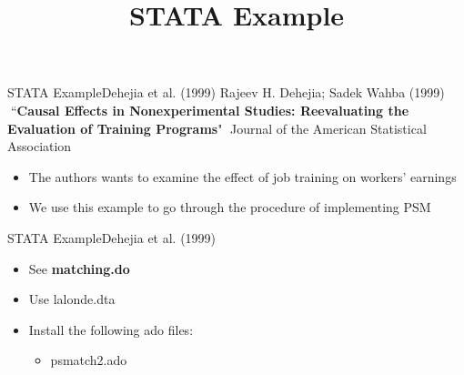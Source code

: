 \documentclass[hyperref={pdfpagelabels=false}]{beamer}
\begin{document}
\title[]  
{STATA Example}


\author 
{}

\institute{}






\date
{}


\begin{frame}{}
	\titlepage
\end{frame}




\begin{frame}{STATA Example}{Dehejia et al. (1999)}	Rajeev H. Dehejia; Sadek Wahba (1999) ``\textbf{Causal Effects in Nonexperimental Studies: Reevaluating the Evaluation of Training Programs}" Journal of the American Statistical Association 
	\begin{itemize}
		\vspace{0.2cm}
		\item The authors wants to examine the effect of job training on workers' earnings
		\vspace{0.2cm}
		\item We use this example to go through the procedure of implementing PSM
	\end{itemize}
\end{frame}


\begin{frame}{STATA Example}{Dehejia et al. (1999)}
	\begin{itemize}
		\item See \textbf{matching.do}
		\vspace{0.2cm}
		\item Use lalonde.dta
		\vspace{0.2cm}
		\item Install the following ado files:
		\begin{itemize}
			\vspace{0.2cm}
			\item psmatch2.ado 
		\end{itemize}
		
	\end{itemize}
\end{frame}
\end{document}

